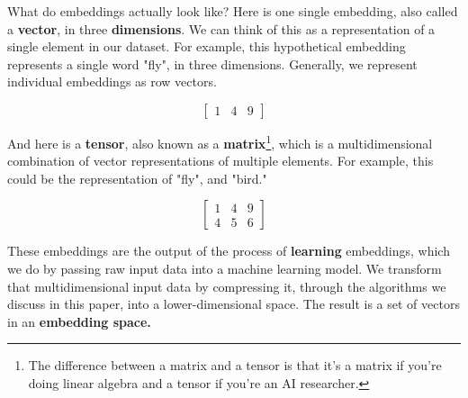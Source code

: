 \documentclass[11pt, table]{diazessay} %
\begin{document}
\begin{sloppypar}
What do embeddings actually look like? Here is one single embedding, also called a \textbf{vector}, in three \textbf{dimensions}. We can think of this as a representation of a single element in our dataset. For example, this hypothetical embedding represents a single word "fly", in three dimensions.  Generally, we represent individual embeddings as row vectors. 

\begin{equation}
\begin{bmatrix}
1 & 4 & 9
\end{bmatrix}
\end{equation}


And here is a \textbf{tensor}, also known as a \textbf{matrix}\footnote{The difference between a matrix and a tensor is that it's a matrix if you're doing linear algebra and a tensor if you're an AI researcher.}, which is a multidimensional combination of vector representations of multiple elements. For example, this could be the representation of "fly", and "bird." 

\begin{equation}
\begin{bmatrix}
1 & 4 & 9\\
4 & 5 & 6
\end{bmatrix}
\end{equation}

These embeddings are the output of the process of \textbf{learning} embeddings, which we do by passing raw input data into a machine learning model. We transform that multidimensional input data by compressing it, through the algorithms we discuss in this paper, into a lower-dimensional space. The result is a set of vectors in an \textbf{embedding space.}  

\begin{figure}[H]
    \centering
\end{figure}
\end{sloppypar}
\end{document}
